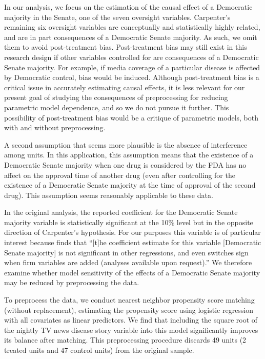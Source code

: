 \documentclass[11pt,titlepage]{article}
\begin{document}
In our analysis, we focus on the estimation of the causal effect of a
Democratic majority in the Senate, one of the seven oversight
variables.  Carpenter's remaining six oversight variables are
conceptually and statistically highly related, and are in part
consequences of a Democratic Senate majority.  As such, we omit them
to avoid post-treatment bias.  Post-treatment bias may still
exist in this research design if other variables controlled for are
consequences of a Democratic Senate majority.  For example, if media
coverage of a particular disease is affected by Democratic control,
bias would be induced.  Although post-treatment bias is a critical
issue in accurately estimating causal effects, it is less relevant for
our present goal of studying the consequences of preprocessing for
reducing parametric model dependence, and so we do not pursue it
further.   This possibility of post-treatment bias would be a critique of parametric 
models, both with and without preprocessing.

A second assumption that seems more plausible is the absence of
interference among units.  In this application, this assumption means
that the existence of a Democratic Senate majority when one drug is
considered by the FDA has no affect on the approval time of another
drug (even after controlling for the existence of a Democratic Senate
majority at the time of approval of the second drug).  This assumption
seems reasonably applicable to these data.

In the original analysis, the reported coefficient for the Democratic
Senate majority variable is statistically significant at the 10\%
level but in the opposite direction of Carpenter's hypothesis.  For
our purposes this variable is of particular interest because
\citet[p.498]{Carp02} finds that ``[t]he coefficient estimate for this
variable [Democratic Senate majority] is not significant in other
regressions, and even switches sign when firm variables are added
(analyses available upon request).''  We therefore examine whether
model sensitivity of the effects of a Democratic Senate majority may
be reduced by preprocessing the data.

To preprocess the data, we conduct nearest neighbor propensity score
matching (without replacement), estimating the propensity score using
logistic regression with all covariates as linear predictors. We find
that including the square root of the nightly TV news disease story
variable into this model significantly improves its balance after
matching. This preprocessing procedure discards 49 units (2 treated
units and 47 control units) from the original sample.
\end{document}
